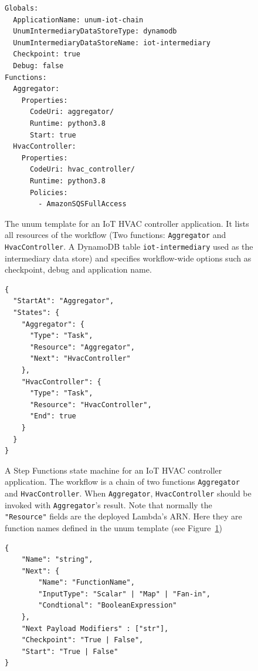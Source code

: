 
\begin{figure}[]
    \begin{verbatim}
Globals:
  ApplicationName: unum-iot-chain
  UnumIntermediaryDataStoreType: dynamodb
  UnumIntermediaryDataStoreName: iot-intermediary
  Checkpoint: true
  Debug: false
Functions:
  Aggregator:
    Properties:
      CodeUri: aggregator/
      Runtime: python3.8
      Start: true
  HvacController:
    Properties:
      CodeUri: hvac_controller/
      Runtime: python3.8
      Policies:
        - AmazonSQSFullAccess
  \end{verbatim}
    \caption{The unum template for an IoT HVAC controller
    application. It lists all resources of the workflow (Two functions:
    \texttt{Aggregator} and \texttt{HvacController}. A DynamoDB table
    \texttt{iot-intermediary} used as the intermediary data store) and
    specifies workflow-wide options such as checkpoint, debug and
    application name.}
    \label{fig:iot-unum-template}
\end{figure}


\begin{figure}[]
    \begin{verbatim}
{
  "StartAt": "Aggregator",
  "States": {
    "Aggregator": {
      "Type": "Task",
      "Resource": "Aggregator",
      "Next": "HvacController"
    },
    "HvacController": {
      "Type": "Task",
      "Resource": "HvacController",
      "End": true
    }
  }
}
    \end{verbatim}
    \caption{A Step Functions state machine for an IoT HVAC controller
    application. The workflow is a chain of two functions \texttt{Aggregator}
    and \texttt{HvacController}. When \texttt{Aggregator},
    \texttt{HvacController} should be invoked with \texttt{Aggregator}'s
    result. Note that normally the \texttt{"Resource"} fields are the deployed
    Lambda's ARN. Here they are function names defined in the unum template
    (see Figure~\ref{fig:iot-unum-template})}
    \label{fig:iot-sf}
\end{figure}

\begin{figure}[]
    \begin{verbatim}
{
    "Name": "string",
    "Next": {
        "Name": "FunctionName",
        "InputType": "Scalar" | "Map" | "Fan-in",
        "Condtional": "BooleanExpression"
    },
    "Next Payload Modifiers" : ["str"],
    "Checkpoint": "True | False",
    "Start": "True | False"
}
    \end{verbatim}
    \caption{}
    \label{fig:unum-config-lang}
\end{figure}

